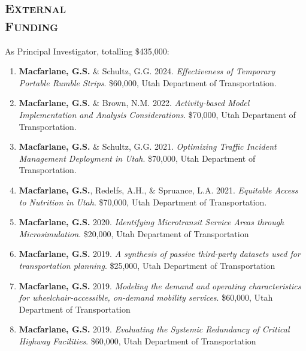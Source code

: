 \documentclass[margin,line]{res}
\newif\ifdetail
\newcounter{enuminitialize}
\newenvironment{myenum}[1][]
{%
 \setcounter{enuminitialize}{#1}
 \addtocounter{enuminitialize}{2}
 \begin{enumerate}[left= 4pt, itemsep=8pt, start=\value{enuminitialize}, label=\arabic*\addtocounter{enumi}{-2}]
}
{%
 \end{enumerate}
}
\newcommand{\secfont}{\scshape }
\begin{document}
\begin{resume}
\noindent\makebox[\linewidth]{\rule{\linewidth}{0.4pt}}
\section{\secfont External \\Funding}

As Principal Investigator, totalling \$435,000:
\vspace{0.3cm}
\begin{myenum}[8]
  \ifdetail {\color{NavyBlue} \fi
  \item {\textbf{Macfarlane, G.S.} \& Schultz, G.G. 2024. \textit{Effectiveness of Temporary Portable Rumble Strips}. \$60,000, Utah Department of Transportation.}
  \item {\textbf{Macfarlane, G.S.} \& Brown, N.M. 2022. \textit{Activity-based Model Implementation and Analysis Considerations}. \$70,000, Utah Department of Transportation.}
  \ifdetail } \fi
  \item {\textbf{Macfarlane, G.S.} \& Schultz, G.G. 2021. \textit{Optimizing Traffic Incident Management Deployment in Utah}. \$70,000, Utah Department of Transportation.}
  \item {\textbf{Macfarlane, G.S.}, Redelfs, A.H., \& Spruance, L.A. 2021. \textit{Equitable Access to Nutrition in Utah}. \$70,000, Utah Department of Transportation.}
  \item {\textbf{Macfarlane, G.S.} 2020. \textit{ Identifying Microtransit Service Areas
through Microsimulation}. \$20,000, Utah Department of Transportation}
  \item {\textbf{Macfarlane, G.S.} 2019. \textit{ A synthesis of passive third-party datasets
used for transportation planning}. \$25,000, Utah Department of Transportation}
  \item {\textbf{Macfarlane, G.S.} 2019. \textit{ Modeling the demand and operating
characteristics for wheelchair-accessible, on-demand mobility services}.
\$60,000, Utah Department of Transportation}
  \item {\textbf{Macfarlane, G.S.} 2019. \textit{ Evaluating the Systemic Redundancy of
Critical Highway Facilities}. \$60,000, Utah Department of Transportation}
\end{myenum}


\end{resume}
\end{document}

